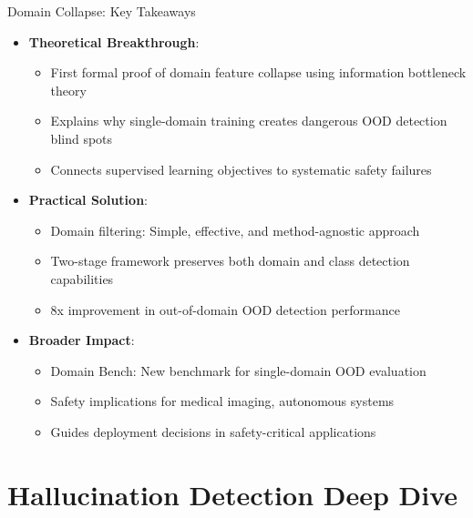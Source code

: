 \documentclass[aspectratio=169]{beamer}
\begin{document}
\begin{frame}{Domain Collapse: Key Takeaways}
\begin{itemize}
    \item \textbf{Theoretical Breakthrough}:
    \begin{itemize}
        \item First formal proof of domain feature collapse using information bottleneck theory
        \item Explains why single-domain training creates dangerous OOD detection blind spots
        \item Connects supervised learning objectives to systematic safety failures
    \end{itemize}
    \item \textbf{Practical Solution}:
    \begin{itemize}
        \item Domain filtering: Simple, effective, and method-agnostic approach
        \item Two-stage framework preserves both domain and class detection capabilities
        \item 8x improvement in out-of-domain OOD detection performance
    \end{itemize}
    \item \textbf{Broader Impact}:
    \begin{itemize}
        \item Domain Bench: New benchmark for single-domain OOD evaluation
        \item Safety implications for medical imaging, autonomous systems
        \item Guides deployment decisions in safety-critical applications
    \end{itemize}
\end{itemize}
\end{frame}

\section{Hallucination Detection Deep Dive}
\end{document}
